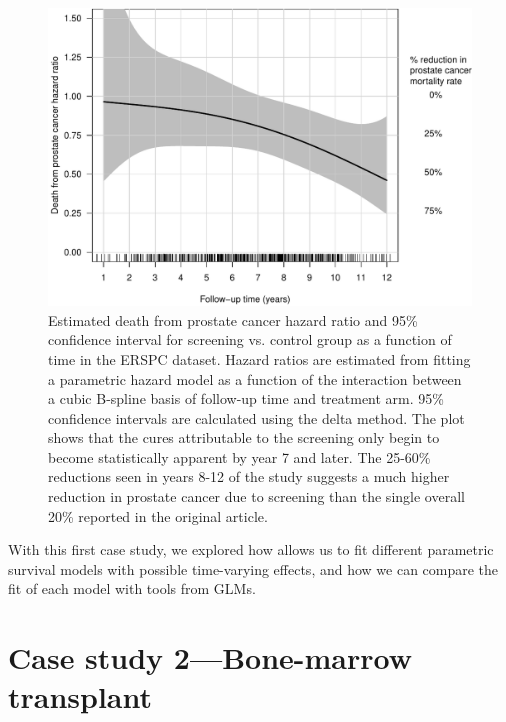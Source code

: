 \documentclass[
]{jss}
\begin{document}
\begin{CodeChunk}
\begin{figure}[ht]

{\centering \includegraphics[width=\textwidth,keepaspectratio=true]{../figures/interaction-ERSPC-1} 

}

\caption[Estimated death from prostate cancer hazard ratio and 95\% confidence interval for screening vs]{Estimated death from prostate cancer hazard ratio and 95\% confidence interval for screening vs. control group as a function of time in the ERSPC dataset. Hazard ratios are estimated from fitting a parametric hazard model as a function of the interaction between a cubic B-spline basis of follow-up time and treatment arm. 95\% confidence intervals are calculated using the delta method. The plot shows that the cures attributable to the screening only begin to become statistically apparent by year 7 and later. The 25-60\% reductions seen in years 8-12 of the study suggests a much higher reduction in prostate cancer due to screening than the single overall 20\% reported in the original article.}\label{fig:interaction-ERSPC}
\end{figure}
\end{CodeChunk}

With this first case study, we explored how  allows us to
fit different parametric survival models with possible time-varying
effects, and how we can compare the fit of each model with tools from
GLMs.

\newpage

\hypertarget{case-study-2bone-marrow-transplant}{%
\section{Case study 2---Bone-marrow
transplant}\label{case-study-2bone-marrow-transplant}}
\end{document}
